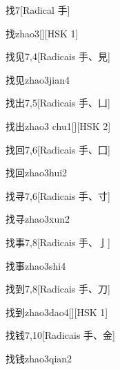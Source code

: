 \begin{entry}{找}{7}[Radical ⼿]
  \begin{phonetics}{找}{zhao3}[][HSK 1]
  \end{phonetics}
\end{entry}

\begin{entry}{找见}{7,4}[Radicais ⼿、⾒]
  \begin{phonetics}{找见}{zhao3jian4}
  \end{phonetics}
\end{entry}

\begin{entry}{找出}{7,5}[Radicais ⼿、⼐]
  \begin{phonetics}{找出}{zhao3 chu1}[][HSK 2]
  \end{phonetics}
\end{entry}

\begin{entry}{找回}{7,6}[Radicais ⼿、⼞]
  \begin{phonetics}{找回}{zhao3hui2}
  \end{phonetics}
\end{entry}

\begin{entry}{找寻}{7,6}[Radicais ⼿、⼨]
  \begin{phonetics}{找寻}{zhao3xun2}
  \end{phonetics}
\end{entry}

\begin{entry}{找事}{7,8}[Radicais ⼿、⼅]
  \begin{phonetics}{找事}{zhao3shi4}
  \end{phonetics}
\end{entry}

\begin{entry}{找到}{7,8}[Radicais ⼿、⼑]
  \begin{phonetics}{找到}{zhao3dao4}[][HSK 1]
  \end{phonetics}
\end{entry}

\begin{entry}{找钱}{7,10}[Radicais ⼿、⾦]
  \begin{phonetics}{找钱}{zhao3qian2}
  \end{phonetics}
\end{entry}

